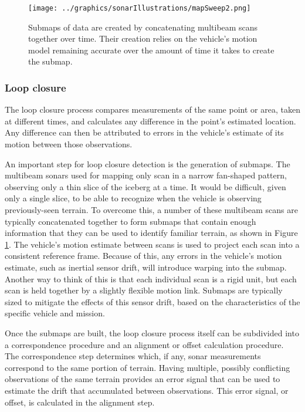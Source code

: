  \begin{figure}[htb]
   \centering
   \texttt{[image: ../graphics/sonarIllustrations/mapSweep2.png]} %
   \caption{Submaps of data are created by concatenating multibeam scans together over time. Their creation relies on the vehicle's motion model remaining accurate over the amount of time it takes to create the submap.}
   \label{fig:SubmapGeneration}
\end{figure}

\subsubsection{Loop closure}
\label{sec:explicitDataCorr}
The loop closure process compares measurements of the same point or area, taken at different times, and calculates any difference in the point's estimated location. Any difference can then be attributed to errors in the vehicle's estimate of its motion between those observations.

An important step for loop closure detection is the generation of submaps. The multibeam sonars used for mapping only scan in a narrow fan-shaped pattern, observing only a thin slice of the iceberg at a time. It would be difficult, given only a single slice, to be able to recognize when the vehicle is observing previously-seen terrain. To overcome this, a number of these multibeam scans are typically concatenated together to form submaps that contain enough information that they can be used to identify familiar terrain, as shown in Figure \ref{fig:SubmapGeneration}. The vehicle's motion estimate between scans is used to project each scan into a consistent reference frame. Because of this, any errors in the vehicle's motion estimate, such as inertial sensor drift, will introduce warping into the submap. Another way to think of this is that each individual scan is a rigid unit, but each scan is held together by a slightly flexible motion link. Submaps are typically sized to mitigate the effects of this sensor drift, based on the characteristics of the specific vehicle and mission.

Once the submaps are built, the loop closure process itself can be subdivided into a correspondence procedure and an alignment or offset calculation procedure. The correspondence step determines which, if any, sonar measurements correspond to the same portion of terrain. Having multiple, possibly conflicting observations of the same terrain provides an error signal that can be used to estimate the drift that accumulated between observations. This error signal, or offset, is calculated in the alignment step. 

